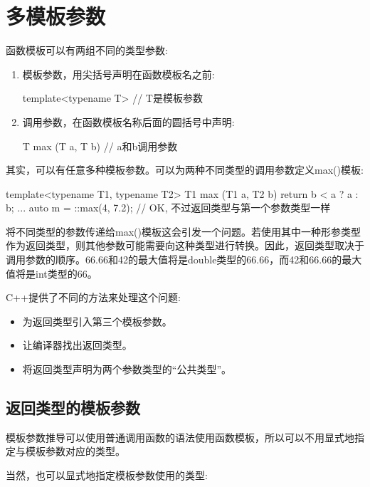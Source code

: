 \section{多模板参数}

函数模板可以有两组不同的类型参数:

\begin{enumerate}
\item 
模板参数，用尖括号声明在函数模板名之前:
\begin{cpp}
template<typename T> // T是模板参数
\end{cpp}

\item 
调用参数，在函数模板名称后面的圆括号中声明:
\begin{cpp}
T max (T a, T b) // a和b调用参数
\end{cpp}
\end{enumerate}

其实，可以有任意多种模板参数。可以为两种不同类型的调用参数定义max()模板:

\begin{cpp}
template<typename T1, typename T2>
T1 max (T1 a, T2 b)
{
	return b < a ? a : b;
}
...
auto m = ::max(4, 7.2); // OK, 不过返回类型与第一个参数类型一样
\end{cpp}

将不同类型的参数传递给max()模板这会引发一个问题。若使用其中一种形参类型作为返回类型，则其他参数可能需要向这种类型进行转换。因此，返回类型取决于调用参数的顺序。66.66和42的最大值将是double类型的66.66，而42和66.66的最大值将是int类型的66。

C++提供了不同的方法来处理这个问题:

\begin{itemize}
\item
为返回类型引入第三个模板参数。

\item
让编译器找出返回类型。

\item
将返回类型声明为两个参数类型的“公共类型”。
\end{itemize}

\subsection{返回类型的模板参数}

模板参数推导可以使用普通调用函数的语法使用函数模板，所以可以不用显式地指定与模板参数对应的类型。

当然，也可以显式地指定模板参数使用的类型:

